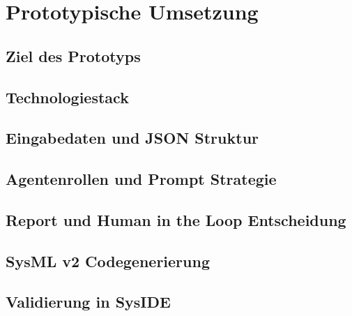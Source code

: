 \section{Prototypische Umsetzung}
\subsection{Ziel des Prototyps}
\subsection{Technologiestack}
\subsection{Eingabedaten und JSON Struktur}
\subsection{Agentenrollen und Prompt Strategie}
\subsection{Report und Human in the Loop Entscheidung}
\subsection{SysML v2 Codegenerierung}
\subsection{Validierung in SysIDE}